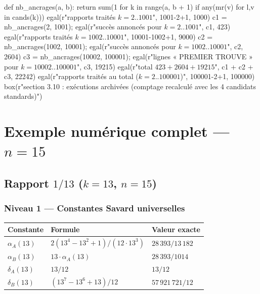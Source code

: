 \documentclass[11pt,a4paper]{article}
\begin{document}
\begin{pycode}
def nb_ancrages(a, b):
    return sum(1 for k in range(a, b + 1) if any(mr(v) for l,v in cands(k)))
egal(r"rapports traités $k=2..1001$", 1001-2+1, 1000)
c1 = nb_ancrages(2, 1001); egal(r"succès annoncés pour $k=2..1001$", c1, 423)
egal(r"rapports traités $k=1002..10001$", 10001-1002+1, 9000)
c2 = nb_ancrages(1002, 10001); egal(r"succès annoncés pour $k=1002..10001$", c2, 2604)
c3 = nb_ancrages(10002, 100001); egal(r"lignes « PREMIER TROUVE » pour $k=10002..100001$", c3, 19215)
egal(r"total $423+2604+19215$", c1 + c2 + c3, 22242)
egal(r"rapports traités au total ($k=2..100001$)", 100001-2+1, 100000)
box(r"section 3.10 : exécutions archivées (comptage recalculé avec les 4 candidats standards)")
\end{pycode}

\section{Exemple numérique complet --- \texorpdfstring{$n = 15$}{n = 15}}

\subsection{Rapport \texorpdfstring{$1/13$}{1/13} (\texorpdfstring{$k = 13$}{k = 13}, \texorpdfstring{$n = 15$}{n = 15})}
\subsubsection{Niveau 1 --- Constantes Savard universelles}

\begin{center}\small
\begin{tabular}{@{}l l l@{}}
\toprule
\rowcolor{spectralgris}
Constante & Formule & Valeur exacte \\
\midrule
$\alpha_A(13)$ & $2(13^{4}-13^{2}+1)/(12\cdot 13^{3})$ & $28\,393/13\,182$ \\
$\alpha_B(13)$ & $13\cdot\alpha_A(13)$ & $28\,393/1014$ \\
$\delta_A(13)$ & $13/12$ & $13/12$ \\
$\delta_B(13)$ & $(13^{7}-13^{6}+13)/12$ & $57\,921\,721/12$ \\
\bottomrule
\end{tabular}
\end{center}
\end{document}

